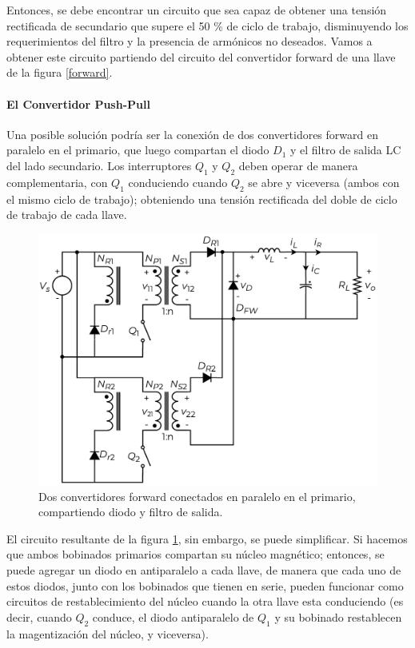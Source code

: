 Entonces, se debe encontrar un circuito que sea capaz de obtener una tensión rectificada de secundario que supere el 50 \% de ciclo de trabajo, disminuyendo los requerimientos del filtro y la presencia de armónicos no deseados. Vamos a obtener este circuito partiendo del circuito del convertidor forward de una llave de la figura \ref{forward}.\\

\paragraph{El Convertidor Push-Pull}

Una posible solución podría ser la conexión de dos convertidores forward en paralelo en el primario, que luego compartan el diodo $D_1$ y el filtro de salida LC del lado secundario. Los interruptores $Q_1$ y $Q_2$ deben operar de manera complementaria, con $Q_1$ conduciendo cuando $Q_2$ se abre y viceversa (ambos con el mismo ciclo de trabajo); obteniendo una tensión rectificada del doble de ciclo de trabajo de cada llave.\\

\begin{figure}[h]
    \centering
    \includegraphics[scale=0.6]{Imagenes/Desarrollo Push-Pull 1.pdf}
    \caption{Dos convertidores forward conectados en paralelo en el primario, compartiendo diodo y filtro de salida.}
    \label{desarrollo_pushpull}
\end{figure}

El circuito resultante de la figura \ref{desarrollo_pushpull}, sin embargo, se puede simplificar. Si hacemos que ambos bobinados primarios compartan su núcleo magnético; entonces, se puede agregar un diodo en antiparalelo a cada llave, de manera que cada uno de estos diodos, junto con los bobinados que tienen en serie, pueden funcionar como circuitos de restablecimiento del núcleo cuando la otra llave esta conduciendo (es decir, cuando $Q_2$ conduce, el diodo antiparalelo de $Q_1$ y su bobinado restablecen la magentización del núcleo, y viceversa).\\

